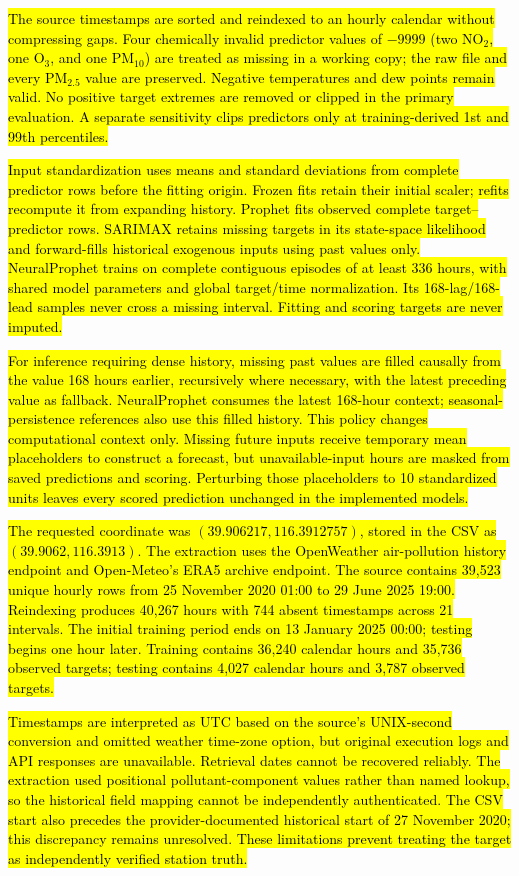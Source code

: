 \documentclass[pdflatex,sn-basic,Numbered]{sn-jnl}
\newcommand{\rev}[1]{\hl{#1}}
\begin{document}
\rev{The source timestamps are sorted and reindexed to an hourly calendar without compressing gaps. Four chemically invalid predictor values of $-9999$ (two NO$_2$, one O$_3$, and one PM$_{10}$) are treated as missing in a working copy; the raw file and every PM$_{2.5}$ value are preserved. Negative temperatures and dew points remain valid. No positive target extremes are removed or clipped in the primary evaluation. A separate sensitivity clips predictors only at training-derived 1st and 99th percentiles.}

\rev{Input standardization uses means and standard deviations from complete predictor rows before the fitting origin. Frozen fits retain their initial scaler; refits recompute it from expanding history. Prophet fits observed complete target--predictor rows. SARIMAX retains missing targets in its state-space likelihood and forward-fills historical exogenous inputs using past values only. NeuralProphet trains on complete contiguous episodes of at least 336 hours, with shared model parameters and global target/time normalization. Its 168-lag/168-lead samples never cross a missing interval. Fitting and scoring targets are never imputed.}

\rev{For inference requiring dense history, missing past values are filled causally from the value 168 hours earlier, recursively where necessary, with the latest preceding value as fallback. NeuralProphet consumes the latest 168-hour context; seasonal-persistence references also use this filled history. This policy changes computational context only. Missing future inputs receive temporary mean placeholders to construct a forecast, but unavailable-input hours are masked from saved predictions and scoring. Perturbing those placeholders to 10 standardized units leaves every scored prediction unchanged in the implemented models.}

\rev{The requested coordinate was $(39.906217,116.3912757)$, stored in the CSV as $(39.9062,116.3913)$. The extraction uses the OpenWeather air-pollution history endpoint and Open-Meteo's ERA5 archive endpoint. The source contains 39,523 unique hourly rows from 25 November 2020 01:00 to 29 June 2025 19:00. Reindexing produces 40,267 hours with 744 absent timestamps across 21 intervals. The initial training period ends on 13 January 2025 00:00; testing begins one hour later. Training contains 36,240 calendar hours and 35,736 observed targets; testing contains 4,027 calendar hours and 3,787 observed targets.}

\rev{Timestamps are interpreted as UTC based on the source's UNIX-second conversion and omitted weather time-zone option, but original execution logs and API responses are unavailable. Retrieval dates cannot be recovered reliably. The extraction used positional pollutant-component values rather than named lookup, so the historical field mapping cannot be independently authenticated. The CSV start also precedes the provider-documented historical start of 27 November 2020; this discrepancy remains unresolved. These limitations prevent treating the target as independently verified station truth.}
\end{document}
